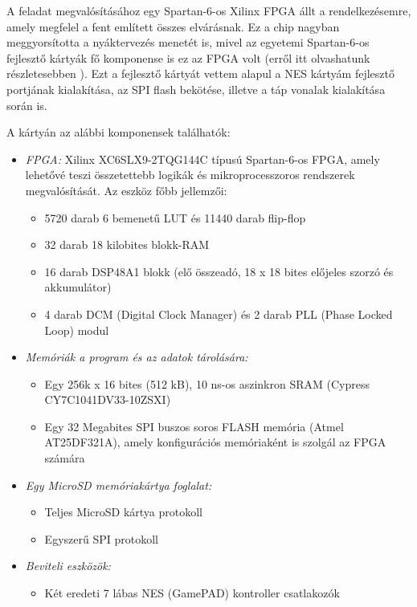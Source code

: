 A feladat megvalósításához egy Spartan-6-os Xilinx FPGA állt a rendelkezésemre, amely megfelel a fent említett összes elvárásnak. Ez a chip nagyban meggyorsította a nyáktervezés menetét is, mivel az egyetemi Spartan-6-os fejlesztő kártyák fő komponense is ez az FPGA volt (erről itt olvashatunk részletesebben \cite{spatan6}). Ezt a fejlesztő kártyát vettem alapul a NES kártyám fejlesztő portjának kialakítása, az SPI flash bekötése, illetve a táp vonalak kialakítása során is. 
	
A kártyán az alábbi komponensek találhatók:

\begin{itemize}
	\item \emph{FPGA:} Xilinx XC6SLX9-2TQG144C típusú Spartan-6-os FPGA, amely lehetővé teszi összetettebb logikák és
	mikroprocesszoros rendszerek megvalósítását. Az eszköz főbb jellemzői:
		\begin{itemize}
			\item 5720 darab 6 bemenetű LUT és 11440 darab flip-flop
			\item 32 darab 18 kilobites blokk-RAM
			\item 16 darab DSP48A1 blokk (elő összeadó, 18 x 18 bites előjeles szorzó és akkumulátor)
			\item 4 darab DCM (Digital Clock Manager) és 2 darab PLL (Phase Locked Loop) modul
		\end{itemize} 
	\item \emph{Memóriák a program és az adatok tárolására:}
		\begin{itemize}
			\item Egy 256k x 16 bites (512 kB), 10 ns-os aszinkron SRAM (Cypress CY7C1041DV33-10ZSXI)
			\item Egy 32 Megabites SPI buszos soros FLASH memória (Atmel AT25DF321A), amely
			konfigurációs memóriaként is szolgál az FPGA számára
		\end{itemize}
	\item \emph{Egy MicroSD memóriakártya foglalat:}
		\begin{itemize}
			\item Teljes MicroSD kártya protokoll
			\item Egyszerű SPI protokoll
		\end{itemize}
	\item \emph{Beviteli eszközök:}
		\begin{itemize}
			\item Két eredeti 7 lábas NES (GamePAD) kontroller csatlakozók

\end{itemize}
\end{itemize}

